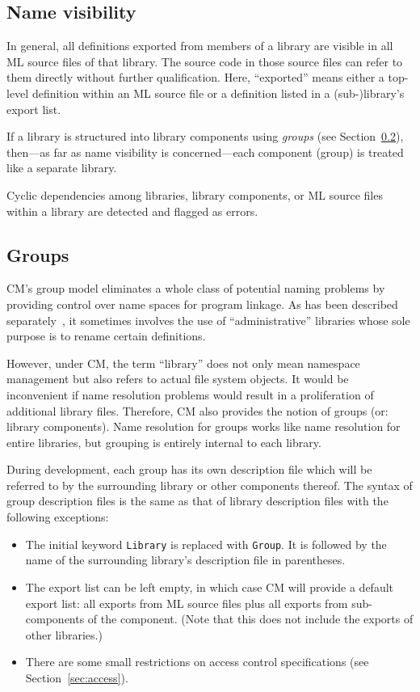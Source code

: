 \documentclass{article}
\begin{document}
\subsection{Name visibility}

In general, all definitions exported from members of a library are
visible in all ML source files of that library.  The source code in
those source files can refer to them directly without further
qualification.  Here, ``exported'' means either a top-level definition
within an ML source file or a definition listed in a (sub-)library's
export list.

If a library is structured into library components using {\em groups}
(see Section~\ref{sec:groups}), then---as far as name visibility is
concerned---each component (group) is treated like a separate library.

Cyclic dependencies among libraries, library components, or ML source
files within a library are detected and flagged as errors.

\subsection{Groups}
\label{sec:groups}

CM's group model eliminates a whole class of potential naming problems
by providing control over name spaces for program linkage. As has been
described separately~\cite{blume:appel:cm99}, it sometimes involves
the use of ``administrative'' libraries whose sole purpose is to
rename certain definitions.

However, under CM, the term ``library'' does not only mean namespace
management but also refers to actual file system objects.  It would be
inconvenient if name resolution problems would result in a
proliferation of additional library files.  Therefore, CM also
provides the notion of groups (or: library components).  Name
resolution for groups works like name resolution for entire libraries,
but grouping is entirely internal to each library.

During development, each group has its own description file which will
be referred to by the surrounding library or other components thereof.
The syntax of group description files is the same as that of library
description files with the following exceptions:

\begin{itemize}
\item The initial keyword {\tt Library} is replaced with {\tt Group}.
It is followed by the name of the surrounding library's description
file in parentheses.
\item The export list can be left empty, in which case CM will
provide a default export list: all exports from ML source files plus
all exports from sub-components of the component.  (Note that this does
not include the exports of other libraries.)
\item There are some small restrictions on access control
specifications (see Section~\ref{sec:access}).
\end{itemize}
\end{document}
